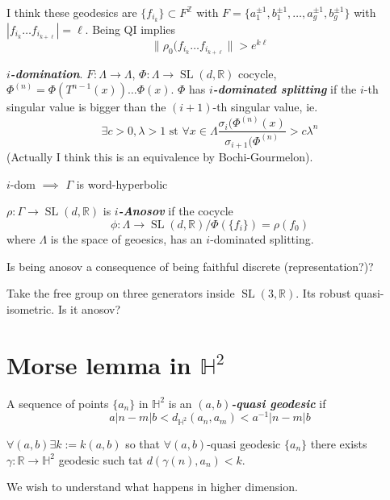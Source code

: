 I think these geodesics are $\{f_{i_{k}}\} \subset F^{\mathbb{Z}}$ with $F=\{a^{\pm 1}_1,b_1^{\pm 1},\ldots,a_g^{\pm 1},b_g^{\pm 1}\}$ with $|f_{i_k}\ldots f_{i_{k+\ell}}| =\ell$.
Being QI implies 
\[\|\rho_0(f_{i_k}\ldots f_{i_{k+ \ell}}\|>e^{k\ell}\]

\begin{defn}
	\textit{\textbf{$i$-domination}}. $F:\Lambda \to \Lambda$, $\Phi:\Lambda \to \operatorname{SL}(d,\mathbb{R})$ cocycle, $\Phi^{(n)}=\Phi(T^{n-1}(x))\ldots \Phi(x)$. $\Phi$ has \textit{\textbf{$i$-dominated splitting}} if the $i$-th singular value is bigger than the $(i+1)$-th singular value, ie.
	\[\exists c>0,\lambda>1\text{ st }\forall x\in\Lambda \dfrac{\sigma_i(\Phi^{(n)}(x)}{\sigma_{i+1}(\Phi^{(n)}}>c\lambda^n \]
	(Actually I think this is an equivalence by Bochi-Gourmelon).
\end{defn}

\begin{thm}\leavevmode
	$i$-dom $\implies $ $\Gamma$ is word-hyperbolic
\end{thm}

\begin{defn}[Rafael and collaborators=BPS]
$\rho:\Gamma\to \operatorname{SL}(d,\mathbb{R})$ is  \textit{\textbf{$i$-Anosov}} if the cocycle \[\phi:\Lambda\to \operatorname{SL}(d,\mathbb{R}) /\Phi(\{f_i\})=\rho(f_0)\]
where $\Lambda$ is the space of geoesics, has an $i$-dominated splitting.
\end{defn}

\begin{question}
	Is being anosov a consequence of being faithful discrete (representation?)?
\end{question}

\begin{question}
	Take the free group on three generators inside $\operatorname{SL}(3,\mathbb{R})$. Its robust quasi-isometric. Is it anosov?
\end{question}

\section{Morse lemma in $\mathbb{H}^2$}

\begin{defn}
	A sequence of points $\{a_n\}$ in $\mathbb{H}^2$ is an \textit{\textbf{$(a,b)$-quasi geodesic}} if
	\[a |n-m|b<d _{\mathbb{H}^2}(a_n,a_m)<a^{-1} |n-m|b\]
\end{defn}

\begin{lemma}[Morse]
	$\forall (a,b)\exists k:=k(a,b)$ so that $\forall (a,b)$-quasi geodesic $\{a_n\}$ there exists $\gamma :\mathbb{R}\to  \mathbb{H}^2$ geodesic such tat $d(\gamma(n),a_n)<k$.
\end{lemma}

We wish to understand what happens in higher dimension.




